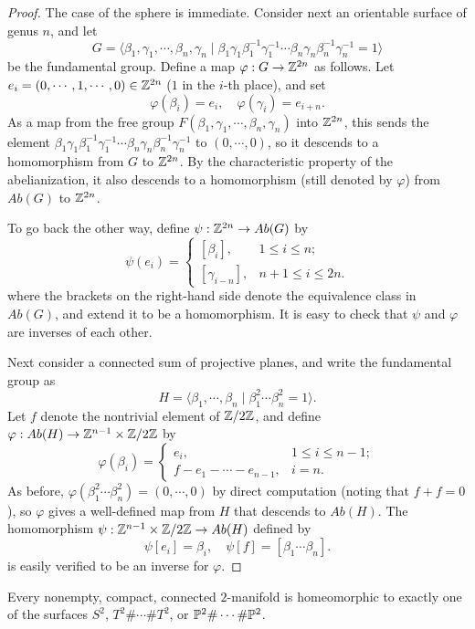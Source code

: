 \begin{proof}
The case of the sphere is immediate. Consider next an orientable surface of genus $n$, and let
\[G=\langle\beta_1,\gamma_1,\cdots,\beta_n,\gamma_n\mid\beta_1\gamma_1\beta_1^{-1}\gamma_1^{-1}\cdots\beta_n\gamma_n\beta_n^{-1}\gamma_n^{-1}=1\rangle\]
be the fundamental group. Define a map $\varphi:G\to\Z^{2n}$ as follows. Let $e_i=(0,\cdots,1,\cdots,0)\in\Z^{2n}$ ($1$ in the $i$-th place), and set
\[\varphi(\beta_i)=e_i,\quad\varphi(\gamma_i)=e_{i+n}.\]
As a map from the free group $F(\beta_1,\gamma_1,\cdots,\beta_n,\gamma_n)$ into $\Z^{2n}$, this sends the element $\beta_1\gamma_1\beta_1^{-1}\gamma_1^{-1}\cdots\beta_n\gamma_n\beta_n^{-1}\gamma_n^{-1}$ to $(0,\cdots,0)$, so it descends to a homomorphism from $G$ to $\Z^{2n}$. By the characteristic property of the abelianization, it also descends to a homomorphism (still denoted by $\varphi$) from $Ab(G)$ to $\Z^{2n}$.\par
To go back the other way, define $\psi:\Z^{2n}\to Ab(G)$ by
\[\psi(e_i)=\begin{cases}
[\beta_i],&1\leq i\leq n;\\
[\gamma_{i-n}],&n+1\leq i\leq 2n.
\end{cases}\]
where the brackets on the right-hand side denote the equivalence class in $Ab(G)$,
and extend it to be a homomorphism. It is easy to check that $\psi$ and $\varphi$ are inverses of each other.\par
Next consider a connected sum of projective planes, and write the fundamental group as
\[H=\langle\beta_1,\cdots,\beta_n\mid\beta_1^2\cdots\beta_n^2=1\rangle.\]
Let $f$ denote the nontrivial element of $\Z/2\Z$, and define $\varphi:Ab(H)\to\Z^{n-1}\times\Z/2\Z$ by
\[\varphi(\beta_i)=\begin{cases}
e_i,&1\leq i\leq n-1;\\
f-e_1-\cdots-e_{n-1},&i=n.
\end{cases}\]
As before, $\varphi(\beta_1^2\cdots\beta_n^2)=(0,\cdots,0)$ by direct computation (noting that $f+f=0$), so $\varphi$ gives a well-defined map from $H$ that descends to $Ab(H)$. The homomorphism $\psi:\Z^{n-1}\times\Z/2\Z\to Ab(H)$ defined by
\[\psi[e_i]=\beta_i,\quad\psi[f]=[\beta_1\cdots\beta_n].\]
is easily verified to be an inverse for $\varphi$.
\end{proof}
\begin{theorem}
Every nonempty, compact, connected $2$-manifold is homeomorphic to exactly one of the surfaces $S^2$, $T^2\#\cdots\#T^2$, or $\P^2\#\cdots\#\P^2$.
\end{theorem}
